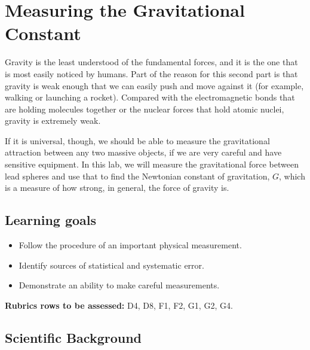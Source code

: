 \chapter{Measuring the Gravitational Constant}


Gravity is the least understood of the fundamental forces, and it is the one that is most easily noticed by humans. Part of the reason for this second part is that gravity is weak enough that we can easily push and move against it (for example, walking or launching a rocket). Compared with the electromagnetic bonds that are holding molecules together or the nuclear forces that hold atomic nuclei, gravity is extremely weak.

If it is universal, though, we should be able to measure the gravitational attraction between any two massive objects, if we are very careful and have sensitive equipment. In this lab, we will measure the gravitational force between lead spheres and use that to find the Newtonian constant of gravitation, $G$, which is a measure of how strong, in general, the force of gravity is.

\section{Learning goals}

\begin{itemize}
	\item Follow the procedure of an important physical measurement.
	
	\item Identify sources of statistical and systematic error.
	
	\item Demonstrate an ability to make careful measurements.
\end{itemize}

\textbf{Rubrics rows to be assessed:} D4, D8, F1, F2, G1, G2, G4.

\section{Scientific Background}

